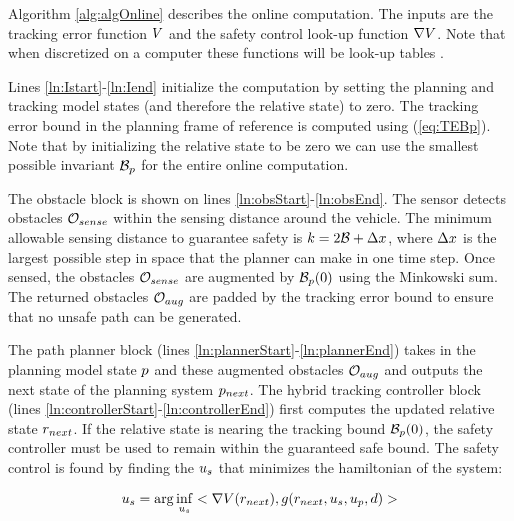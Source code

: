 Algorithm \ref{alg:algOnline} describes the online computation. The inputs are the tracking error function $V$ and the safety control look-up function $\nabla V$. Note that when discretized on a computer these functions will be look-up tables . 

Lines \ref{ln:Istart}-\ref{ln:Iend} initialize the computation by setting the planning and tracking model states (and therefore the relative state) to zero. The tracking error bound in the planning frame of reference is computed using (\ref{eq:TEBp}). Note that by initializing the relative state to be zero we can use the smallest possible invariant $\mathcal B_p$ for the entire online computation. 

The obstacle block is shown on lines \ref{ln:obsStart}-\ref{ln:obsEnd}. The sensor detects obstacles $\mathcal{O}_{sense}$ within the sensing distance around the vehicle. The minimum allowable sensing distance to guarantee safety is $k = 2\mathcal B + \Delta x$, where $\Delta x$ is the largest possible step in space that the planner can make in one time step.  Once sensed, the obstacles $\mathcal{O}_{sense}$ are augmented by $\mathcal B_p(0)$ using the Minkowski sum. The returned obstacles $\mathcal{O}_{aug}$ are padded by the tracking error bound to ensure that no unsafe path can be generated.


 The path planner block (lines \ref{ln:plannerStart}-\ref{ln:plannerEnd}) takes in the planning model state $p$ and these augmented obstacles $\mathcal{O}_{aug}$ and outputs the next state of the planning system $p_{next}$. The hybrid tracking controller block (lines \ref{ln:controllerStart}-\ref{ln:controllerEnd}) first computes the updated relative state $r_{next}$. If the relative state is nearing the tracking bound $\mathcal B_p(0)$, the safety controller must be used to remain within the guaranteed safe bound. The safety control is found by finding the $u_s$ that minimizes the hamiltonian of the system:

\begin{equation}
	u_s = \arg\inf_{u_s} <\nabla V(r_{next}),g(r_{next},u_s,u_p,d)>
\end{equation}

